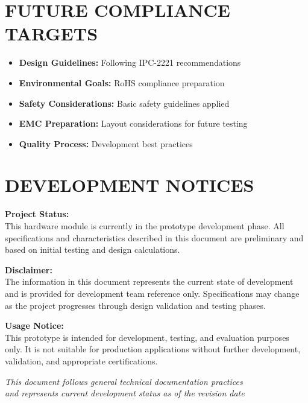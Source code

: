 \documentclass[11pt,a4paper]{article}
\begin{document}
\begin{titlepage}
    \section*{FUTURE COMPLIANCE TARGETS}
    \begin{itemize}
        \item \textbf{Design Guidelines:} Following IPC-2221 recommendations
        \item \textbf{Environmental Goals:} RoHS compliance preparation
        \item \textbf{Safety Considerations:} Basic safety guidelines applied
        \item \textbf{EMC Preparation:} Layout considerations for future testing
        \item \textbf{Quality Process:} Development best practices
    \end{itemize}
    
    \vspace{1cm}
    
    \section*{DEVELOPMENT NOTICES}
    
    \textbf{Project Status:}\\
    This hardware module is currently in the prototype development phase. All specifications and characteristics described in this document are preliminary and based on initial testing and design calculations.
    
    \textbf{Disclaimer:}\\
    The information in this document represents the current state of development and is provided for development team reference only. Specifications may change as the project progresses through design validation and testing phases.
    
    \textbf{Usage Notice:}\\
    This prototype is intended for development, testing, and evaluation purposes only. It is not suitable for production applications without further development, validation, and appropriate certifications.
    
    \vfill
    
    \begin{center}
    {\small \textit{This document follows general technical documentation practices}}\\
    {\small \textit{and represents current development status as of the revision date}}
    \end{center}
    
\end{titlepage}
\end{document}
